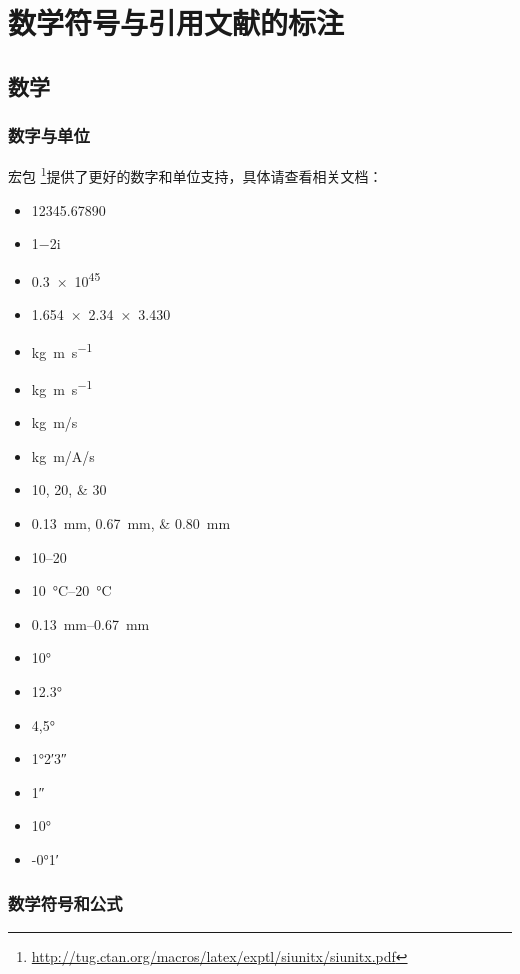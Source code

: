 \chapter{数学符号与引用文献的标注}

\section{数学}

\subsection{数字与单位}

宏包  \footnote{\url{http://tug.ctan.org/macros/latex/exptl/siunitx/siunitx.pdf}}提供了更好的数字和单位支持，具体请查看相关文档：
\begin{itemize}
	\item \num{12345,67890}
	\item \num[parse-numbers=false]{1-2i}
	\item \num{.3e45}
	\item \num[parse-numbers=false]{1.654 x 2.34 x 3.430}
	\item \si{kg.m.s^{-1}}
	\item \si{\kilogram\metre\per\second}
	\item \si[per-mode=symbol]{\kilogram\metre\per\second}
	\item \si[per-mode=symbol]{\kilogram\metre\per\ampere\per\second}
	\item \numlist{10;20;30}
	\item \SIlist{0.13;0.67;0.80}{\milli\metre}
	\item \numrange{10}{20}
    \item \SIrange{10}{20}{\degreeCelsius}
	\item \SIrange{0.13}{0.67}{\milli\metre}
	\item \ang{10}
	\item \ang{12.3}
	\item \ang{4,5}
	\item \ang{1;2;3}
	\item \ang{;;1}
	\item \ang{+10;;}
	\item \ang{-0;1;}
\end{itemize}

\subsection{数学符号和公式}

